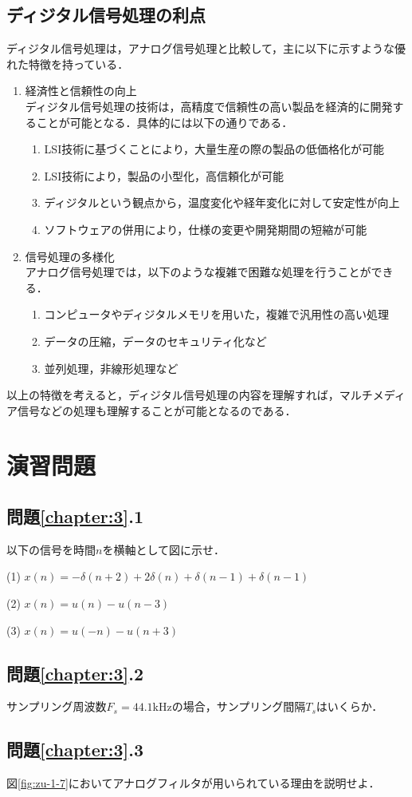 \subsection{ディジタル信号処理の利点}

ディジタル信号処理は，アナログ信号処理と比較して，主に以下に示すような優れた特徴を持っている．
\begin{enumerate}
\item 経済性と信頼性の向上\\
ディジタル信号処理の技術は，高精度で信頼性の高い製品を経済的に開発することが可能となる．具体的には以下の通りである．
\begin{enumerate}
\item {}LSI技術に基づくことにより，大量生産の際の製品の低価格化が可能
\item LSI技術により，製品の小型化，高信頼化が可能
\item ディジタルという観点から，温度変化や経年変化に対して安定性が向上
\item ソフトウェアの併用により，仕様の変更や開発期間の短縮が可能
\end{enumerate}
\item 信号処理の多様化\\
アナログ信号処理では，以下のような複雑で困難な処理を行うことができる．
\begin{enumerate}
\item コンピュータやディジタルメモリを用いた，複雑で汎用性の高い処理
\item データの圧縮，データのセキュリティ化など
\item 並列処理，非線形処理など
\end{enumerate}
\end{enumerate}

以上の特徴を考えると，ディジタル信号処理の内容を理解すれば，マルチメディア信号などの処理も理解することが可能となるのである．

\section*{演習問題}

\subsection*{問題\ref{chapter:3}.1}

以下の信号を時間$n$を横軸として図に示せ．

(1) $x(n)=-\delta(n+2)+2\delta(n)+\delta(n-1)+\delta(n-1)$

(2) $x(n)=u(n)-u(n-3)$

(3) $x(n)=u(-n)-u(n+3)$


\subsection*{問題\ref{chapter:3}.2}

サンプリング周波数$F_s=44.1$kHzの場合，サンプリング間隔$T_s$はいくらか．

\subsection*{問題\ref{chapter:3}.3}

図\ref{fig:zu-1-7}においてアナログフィルタが用いられている理由を説明せよ．



